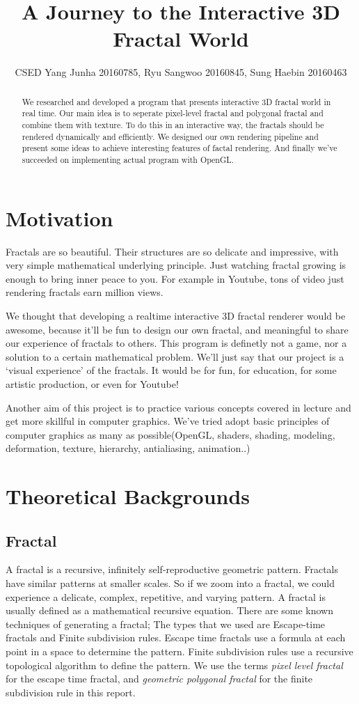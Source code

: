 \documentclass[a4paper]{article}
\title{A Journey to the Interactive 3D Fractal World}
\author{CSED Yang Junha 20160785, Ryu Sangwoo 20160845, Sung Haebin 20160463}
\begin{document}
\maketitle
\begin{abstract}
We researched and developed a program that presents interactive 3D fractal world in real time.
Our main idea is to seperate pixel-level fractal and polygonal fractal and combine them with texture.
To do this in an interactive way, the fractals should be rendered dynamically and efficiently.
We designed our own rendering pipeline and present some ideas to achieve interesting features of factal rendering.
And finally we've succeeded on implementing actual program with OpenGL.
\end{abstract}
\section{Motivation}
Fractals are so beautiful.
Their structures are so delicate and impressive, with very simple mathematical underlying principle.
Just watching fractal growing is enough to bring inner peace to you.
For example in Youtube, tons of video just rendering fractals earn million views.

We thought that developing a realtime interactive 3D fractal renderer would be awesome,
because it'll be fun to design our own fractal, and meaningful to share our experience of fractals to others.
This program is definetly not a game, nor a solution to a certain mathematical problem.
We'll just say that our project is a `visual experience' of the fractals.
It would be for fun, for education, for some artistic production, or even for Youtube!

Another aim of this project is to practice various concepts covered in lecture and get more skillful in computer graphics.
We've tried adopt basic principles of computer graphics as many as possible(OpenGL, shaders, shading, modeling, deformation, texture, hierarchy, antialiasing, animation..)

\section{Theoretical Backgrounds}
\subsection{Fractal}
A fractal is a recursive, infinitely self-reproductive geometric pattern.
Fractals have similar patterns at smaller scales.
So if we zoom into a fractal, we could experience a delicate, complex, repetitive, and varying pattern.
A fractal is usually defined as a mathematical recursive equation.
There are some known techniques of generating a fractal;
The types that we used are Escape-time fractals and Finite subdivision rules.
Escape time fractals use a formula at each point in a space to determine the pattern.
Finite subdivision rules use a recursive topological algorithm to define the pattern.
We use the terms \textit{pixel level fractal} for the escape time fractal, and \textit{geometric polygonal fractal} for the finite subdivision rule in this report.
\end{document}
